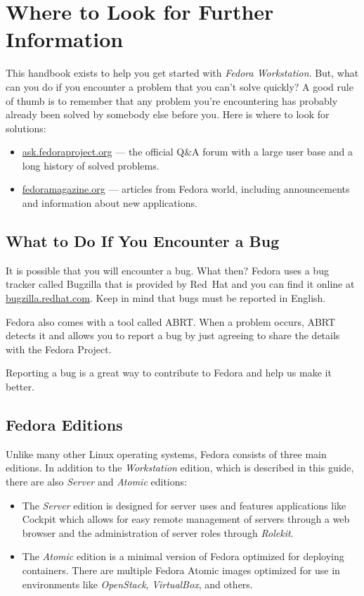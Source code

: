 \chapter*{Where to Look for Further Information}

This handbook exists to help you get started with \emph{Fedora Workstation}. But, what can you do if you encounter a problem that you can't solve quickly? A good rule of thumb is to remember that any problem you're encountering has probably already been solved by somebody else before you. Here is where to look for solutions:
\begin{itemize}
\item\url{ask.fedoraproject.org} --- the official Q\&A forum with a large user base and a long history of solved problems.

\item\url{fedoramagazine.org} --- articles from Fedora world, including announcements and information about new applications.
\end{itemize}

\section*{What to Do If You Encounter a Bug}

It is possible that you will encounter a bug. What then? Fedora uses a bug tracker called Bugzilla that is provided by Red~Hat and you can find it online at \url{bugzilla.redhat.com}. Keep in mind that bugs must be reported in English.

Fedora also comes with a tool called ABRT. When a problem occurs, ABRT detects it and allows you to report a bug by just agreeing to share the details with the Fedora Project.

Reporting a bug is a great way to contribute to Fedora and help us make it better.

\section*{Fedora Editions}

Unlike many other Linux operating systems, Fedora consists of three main editions. In addition to the \emph{Workstation} edition, which is described in this guide, there are also \emph{Server} and \emph{Atomic} editions:
\begin{itemize}
\item The \emph{Server} edition is designed for server uses and features applications like Cockpit which allows for easy remote management of servers through a web browser and the administration of server roles through \emph{Rolekit}.

\item The \emph{Atomic} edition is a minimal version of Fedora optimized for deploying containers. There are multiple Fedora Atomic images optimized for use in environments like \emph{OpenStack}, \emph{VirtualBox}, and others.
\end{itemize}

